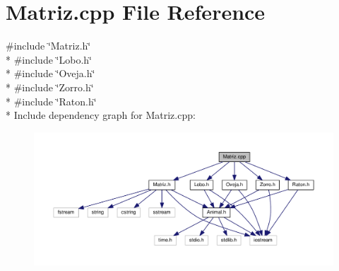 \section{Matriz.\-cpp File Reference}
\label{_matriz_8cpp}
{\ttfamily \#include \char`\"{}Matriz.\-h\char`\"{}}\\*
{\ttfamily \#include \char`\"{}Lobo.\-h\char`\"{}}\\*
{\ttfamily \#include \char`\"{}Oveja.\-h\char`\"{}}\\*
{\ttfamily \#include \char`\"{}Zorro.\-h\char`\"{}}\\*
{\ttfamily \#include \char`\"{}Raton.\-h\char`\"{}}\\*
Include dependency graph for Matriz.\-cpp\-:
\nopagebreak
\begin{figure}[H]
\begin{center}
\leavevmode
\includegraphics[width=350pt]{_matriz_8cpp__incl}
\end{center}
\end{figure}

